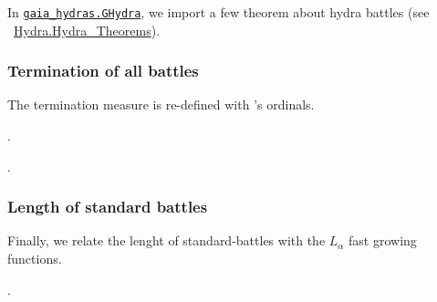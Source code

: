 In \href{../theories/html/gaia_hydras.GHydra.html}%
{\texttt{gaia\_hydras.GHydra}}, we import a few theorem about hydra battles (see
~\href{../theories/html/theories/html/hydras.Hydra.Hydra_Theorems.html}{Hydra.Hydra\_Theorems}).

\subsubsection{Termination of all battles}

The termination measure is re-defined with \gaia's ordinals.

.

.

\subsubsection{Length of standard battles}
  
Finally, we relate the lenght of standard-battles with the $L_\alpha$ fast growing functions.

.




  



